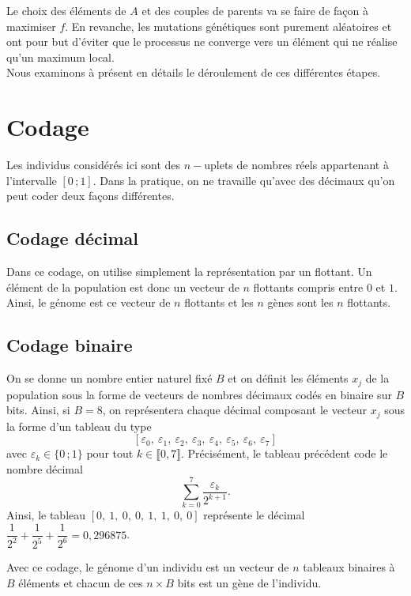 Le choix des éléments de $A$ et des couples de \og parents \fg{} va se faire de façon à maximiser $f$. En revanche, les mutations génétiques sont purement aléatoires et ont pour but d'éviter que le processus ne converge vers un élément qui ne réalise qu'un maximum local.\\

Nous examinons à présent en détails le déroulement de ces différentes étapes.

\section{Codage}

Les individus considérés ici sont des $n-$uplets de nombres réels appartenant à l'intervalle $[0\,;1]$. Dans la pratique, on ne travaille qu'avec des décimaux qu'on peut coder deux façons différentes.

\subsection{Codage décimal}
Dans ce codage, on utilise simplement la représentation par un flottant. Un élément de la population est donc un vecteur de $n$ flottants compris entre $0$ et $1$. Ainsi, le génome est ce vecteur de $n$ flottants et les $n$ gènes sont les $n$ flottants.

\subsection{Codage binaire}

On se donne un nombre entier naturel fixé $B$ et on définit les éléments $x_j$ de la population sous la forme de vecteurs de nombres décimaux codés en binaire sur $B$ bits. Ainsi, si $B=8$, on représentera chaque décimal composant le vecteur $x_j$ sous la forme d'un tableau du type $$[\varepsilon_0,~\varepsilon_1,~\varepsilon_2,~\varepsilon_3,~\varepsilon_4,~\varepsilon_5,~\varepsilon_6,~\varepsilon_7]$$
avec $\varepsilon_k\in\{0\,;1\}$ pour tout $k\in\llbracket 0, 7\rrbracket$. Précisément, le tableau précédent code le nombre décimal 
$$\sum\limits_{k=0}^7 \frac{\varepsilon_k}{2^{k+1}}.$$
Ainsi, le tableau $[0,~1,~0,~0,~1,~1,~0,~0]$ représente le décimal $\dfrac{1}{2^2}+\dfrac{1}{2^5}+\dfrac{1}{2^6}=0{,}296875$.

Avec ce codage, le génome d'un individu est un vecteur de $n$ tableaux binaires à $B$ éléments et chacun de ces $n\times B$ bits est un gène de l'individu.

